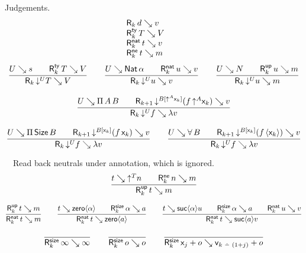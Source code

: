 \documentclass[acmlarge,review,anonymous]{acmart}\settopmatter{printfolios=true}
\begin{document}
Judgements.
\[
\begin{array}{l@{\qquad}l}
   \R k d  v     & \mbox{} \\
   \RTy k T  V  & \mbox{} \\
   \RNat k t  v & \mbox{} \\
   \RNe k t  m  & \mbox{} \\
\end{array}
\]
\begin{gather*}
  \ru{U \evalsto s \qquad
      \RTy k T V
    }{\R k {\down{U} T} V}
\qquad
  \ru{U \evalsto \Nat \alpha \qquad
      \RNat k u v
    }{\R k {\down{U} u} v}
\qquad
  \ru{U \evalsto N \qquad
      \RUp k u m
    }{\R k {\down{U} u} m}
\\[2ex]
  \ru{U \evalsto \piT A B \qquad
      \R{k+1} {\down{B[\up A \lev k]} (f\,\up A \lev k)} v
    }{\R k {\down{U} f} {\lambda v}}
\\[2ex]
  \ru{U \evalsto \piT \Size B \qquad
      \R{k+1} {\down{B[\lev k]} (f\,\lev k)} v
    }{\R k {\down{U} f} {\lambda v}}
\qquad
  \ru{U \evalsto \forallT B \qquad
      \R{k+1} {\down{B[\lev k]} (f\,\ann{\lev k})} v
    }{\R k {\down{U} f} {\lambda v}}
\end{gather*}

\ \  Read back neutrals under annotation, which is ignored.
\begin{gather*}
  \ru{t \evalsto \up T n \qquad
      \RNe k n m
    }{\RUp k t m}
\end{gather*}

\begin{gather*}
  \ru{%
      \RUp k t m
    }{\RNat k t m}
\qquad
  \ru{t \evalsto \zero{\alpha} \qquad
      \RSize k {\alpha} a
    }{\RNat k t {\zero a}}
\qquad
  \ru{t \evalsto \suc{\alpha}u \qquad
      \RSize k {\alpha} a \qquad
      \RNat k u v
    }{\RNat k t {\suc a v}}
\end{gather*}

\begin{gather*}
  \ru{
    }{\RSize k \infty \infty}
\qquad
  \ru{
    }{\RSize k o o}
\qquad
  \ru{
    }{\RSize k {\lev j + o} {\ind{k\dotminus(1+j)} + o}}
\end{gather*}
\end{document}
